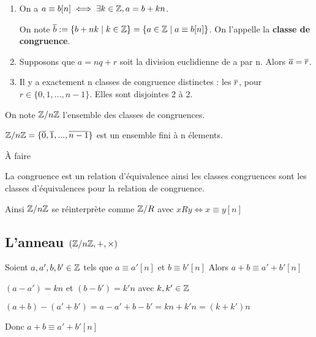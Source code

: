 \documentclass[a4paper, 12pt]{article}
\begin{document}
\begin{proposition}
    \begin{enumerate}
        \item On a $a \equiv b [n] \iff \exists k \in \mathbb{Z}, a = b + kn$.
        
        On note $\overline{b} := \{b + nk \mid k \in \mathbb{Z}\} = \{a \in \mathbb{Z} \mid a \equiv b [n]\}$. On l'appelle la \textbf{classe de congruence}.
    
        \item Supposons que $a = nq + r$ soit la division euclidienne de a par n. Alors $\overline{a} = \overline{r}$.
        \item Il y a exactement n classes de congruence distinctes : les $\overline{r}$, pour $r \in \{0, 1, ..., n-1\}$. Elles sont disjointes 2 à 2.
    \end{enumerate}
\end{proposition}

\begin{definition}
    On note $\mathbb{Z}/n\mathbb{Z}$ l'ensemble des classes de congruences.

    $\mathbb{Z}/n\mathbb{Z} = \{\overline{0}, \overline{1}, ..., \overline{n-1}\}$ est un ensemble fini à n élements.
\end{definition}

\begin{demonstration}
    À faire
\end{demonstration}

\begin{remark}
    La congruence est un relation d'équivalence ainsi les classes congruences sont les classes d'équivalences pour la relation de congruence.

    Ainsi $\mathbb{Z}/n\mathbb{Z}$ se réinterprète comme $\mathbb{Z}/R$ avec $xRy \iff x \equiv y [n]$
\end{remark}

\subsection{L'anneau $(\mathbb{Z}/n\mathbb{Z}, +, \times)$}

\begin{proposition}
    Soient $a, a', b, b' \in \mathbb{Z}$ tels que $a \equiv a' [n]$ et $b \equiv b' [n]$
    Alors $a + b \equiv a' + b' [n]$
\end{proposition}

\begin{demonstration}
    \item $(a - a') = kn$ et $(b - b') = k'n$ avec $k, k' \in \mathbb{Z}$

    \item $(a + b) - (a' + b') = a - a' + b - b' = kn + k'n = (k + k')n$

    \begin{rdem}
        \item Donc $a + b \equiv a' + b' [n]$
    \end{rdem}
\end{demonstration}
\end{document}
